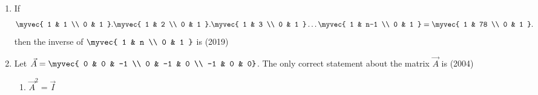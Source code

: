 \begin{enumerate}[label=\thesubsection.\arabic*.,ref=\thesubsection.\theenumi]
\begin{enumerate}
\end{enumerate} 
\item If \begin{align*}\myvec{
    1 & 1 \\
    0 & 1
}.\myvec{
    1 & 2 \\
    0 & 1
}.\myvec{
    1 & 3 \\
    0 & 1
}\dots \myvec{
    1 & n-1 \\
    0 & 1
}=\myvec{
    1 & 78 \\
    0 & 1
}.\end{align*}
then the inverse of $\myvec{
    1 & n \\
    0 & 1
}$ is 
\hfill{(2019)} 
\begin{enumerate}
\end{enumerate}
	\item Let $\vec{A}=\myvec{
			0 & 0 & -1 \\
			0 & -1 & 0 \\
			-1 & 0 & 0}$. The only correct statement about the matrix $\vec{A}$ is \hfill{(2004)}
\begin{multicols}{2}
		\begin{enumerate}
			\item $\vec{A}^2=\vec{I}$

\end{enumerate}
\end{multicols}
\end{enumerate}
